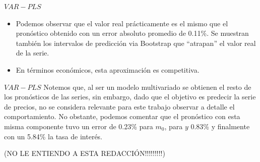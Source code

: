 \documentclass{beamer}
\newcommand{\?}{?`}
\begin{document}
\begin{frame}{$VAR-PLS$}
  \begin{figure}[htbp]
  \end{figure}
  \begin{footnotesize}
    \begin{itemize}
    \item Podemos observar que el valor real pr\'acticamente es el mismo
      que el pron\'ostico obtenido con un error absoluto promedio de
      0.11\%. Se muestran tambi\'en los intervalos de predicci\'on via
      Bootstrap que ``atrapan'' el valor real de la serie.
    \item En t\'erminos econ\'omicos, esta aproximaci\'on es competitiva.
    \end{itemize}
  \end{footnotesize}
\end{frame}

\begin{frame}{$VAR-PLS$}
  Notemos que, al ser un modelo multivariado se obtienen el resto de
  los pron\'osticos de las series, sin embargo, dado que el objetivo
  es predecir la serie de precios, no se considera relevante para este
  trabajo observar a detalle el comportamiento. No obstante, podemos
  comentar que el pron\'ostico con esta misma componente tuvo un error
  de 0.23\% para $m_0$, para $y$ 0.83\% y finalmente con un 5.84\% la
  tasa de inter\'es. 

  (NO LE ENTIENDO A ESTA REDACCI\'ON!!!!!!!!!)
\end{frame}
\end{document}
